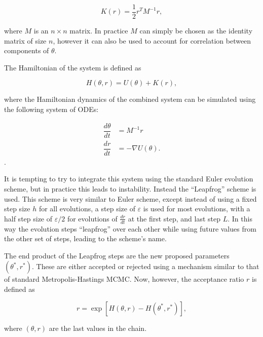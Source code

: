     \begin{equation}
        K(r) = \frac{1}{2} r^T M^{-1} r,
    \end{equation}

    where $M$ is an $n \times n$ matrix. In practice $M$ can simply be chosen as the identity matrix of size $n$, however it can also be used to account for correlation between components of $\theta$.

    The Hamiltonian of the system is defined as

    \begin{equation}
        H(\theta,r) = U(\theta) + K(r),
    \end{equation}

    where the Hamiltonian dynamics of the combined system can be simulated using the following system of ODEs:

    \begin{equation}
        \begin{array}{rl}
        \displaystyle
            \dfrac{d\theta}{dt} & = M^{-1} r \\
            \dfrac{dr}{dt} & = - \nabla U(\theta) .
        \end{array}
    \end{equation}.

    It is tempting to try to integrate this system using the standard Euler evolution scheme, but in practice this leads to instability. Instead the ``Leapfrog'' scheme is used. This scheme is very similar to Euler scheme, except instead of using a fixed step size $h$ for all evolutions, a step size of $\varepsilon$ is used for most evolutions, with a half step size of $\varepsilon / 2$ for evolutions of $\frac{dr}{dt}$ at the first step, and last step $L$. In this way the evolution steps ``leapfrog'' over each other while using future values from the other set of steps, leading to the scheme's name.

    The end product of the Leapfrog steps are the new proposed parameters $(\theta^*,r^*)$. These are either accepted or rejected using a mechanism similar to that of standard Metropolis-Hastings MCMC. Now, however, the acceptance ratio $r$ is defined as

    \begin{equation}
        r = \exp \left[ H(\theta,r) - H(\theta^*,r^*) \right],
    \end{equation}

    where $(\theta,r)$ are the last values in the chain.

